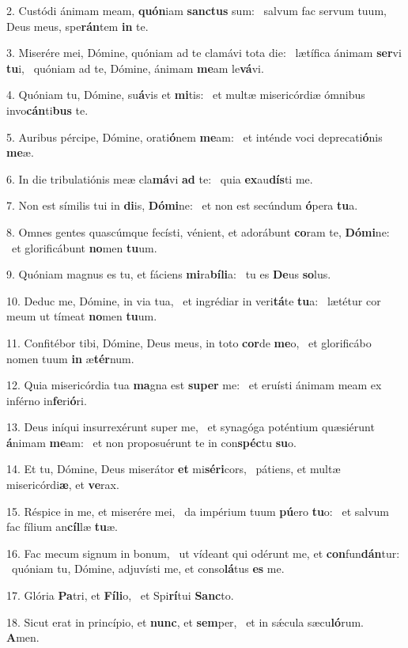 2. Custódi ánimam meam, \textbf{quón}iam \textbf{sanc}\textbf{tus} sum: \ast\  salvum fac servum tuum, Deus meus, spe\textbf{rán}tem \textbf{in} te.\

3. Miserére mei, Dómine, quóniam ad te clamávi tota die: \dag\  lætífica ánimam \textbf{ser}vi \textbf{tu}i, \ast\  quóniam ad te, Dómine, ánimam \textbf{me}am le\textbf{vá}vi.\

4. Quóniam tu, Dómine, su\textbf{á}vis et \textbf{mi}tis: \ast\  et multæ misericórdiæ ómnibus invo\textbf{cán}ti\textbf{bus} te.\

5. Auribus pércipe, Dómine, orati\textbf{ó}nem \textbf{me}am: \ast\  et inténde voci deprecati\textbf{ó}nis \textbf{me}æ.\

6. In die tribulatiónis meæ cla\textbf{má}vi \textbf{ad} te: \ast\  quia \textbf{ex}au\textbf{dís}ti me.\

7. Non est símilis tui in \textbf{di}is, \textbf{Dó}\textbf{mi}ne: \ast\  et non est secúndum \textbf{ó}pera \textbf{tu}a.\

8. Omnes gentes quascúmque fecísti, vénient, et adorábunt \textbf{co}ram te, \textbf{Dó}\textbf{mi}ne: \ast\  et glorificábunt \textbf{no}men \textbf{tu}um.\

9. Quóniam magnus es tu, et fáciens \textbf{mi}ra\textbf{bí}\textbf{li}a: \ast\  tu es \textbf{De}us \textbf{so}lus.\

10. Deduc me, Dómine, in via tua, \dag\  et ingrédiar in veri\textbf{tá}te \textbf{tu}a: \ast\  lætétur cor meum ut tímeat \textbf{no}men \textbf{tu}um.\

11. Confitébor tibi, Dómine, Deus meus, in toto \textbf{cor}de \textbf{me}o, \ast\  et glorificábo nomen tuum \textbf{in} æ\textbf{tér}num.\

12. Quia misericórdia tua \textbf{ma}gna est \textbf{su}\textbf{per} me: \ast\  et eruísti ánimam meam ex inférno in\textbf{fe}ri\textbf{ó}ri.\

13. Deus iníqui insurrexérunt super me, \dag\  et synagóga poténtium quæsiérunt \textbf{á}nimam \textbf{me}am: \ast\  et non proposuérunt te in con\textbf{spéc}tu \textbf{su}o.\

14. Et tu, Dómine, Deus miserátor \textbf{et} mi\textbf{sé}\textbf{ri}cors, \ast\  pátiens, et multæ misericórdi\textbf{æ}, et \textbf{ve}rax.\

15. Réspice in me, et miserére mei, \dag\  da impérium tuum \textbf{pú}ero \textbf{tu}o: \ast\  et salvum fac fílium an\textbf{cíl}læ \textbf{tu}æ.\

16. Fac mecum signum in bonum, \dag\  ut vídeant qui odérunt me, et \textbf{con}fun\textbf{dán}tur: \ast\  quóniam tu, Dómine, adjuvísti me, et conso\textbf{lá}tus \textbf{es} me.\

17. Glória \textbf{Pa}tri, et \textbf{Fí}\textbf{li}o, \ast\  et Spi\textbf{rí}tui \textbf{Sanc}to.\

18. Sicut erat in princípio, et \textbf{nunc}, et \textbf{sem}per, \ast\  et in sǽcula sæcu\textbf{ló}rum. \textbf{A}men.\

